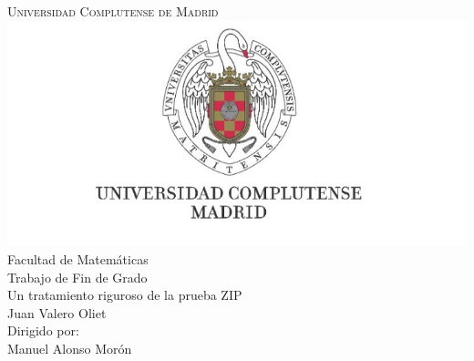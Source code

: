 \documentclass[10pt]{report}
\theoremstyle{definition}
\newcommand\blankpage{%
    \null
    \thispagestyle{empty}%
    \newpage}
\begin{document}
\begin{titlepage} %
\begin{center} %

\huge\textsc{Universidad Complutense de Madrid}\\[0.2in]
\includegraphics[scale=0.8]{comlu}\\[0.1in] %

\Large{Facultad de Matemáticas}\\[0.5in] %
\Large{Trabajo de Fin de Grado}\\[.1in]
\Huge {Un tratamiento riguroso de la prueba ZIP}\\[0.2in]



\vfill %
\Large {Juan Valero Oliet}\\[0.5in]
\vfill 
Dirigido por:\\
Manuel Alonso Morón\\[.1in]
\Large{}%
\end{center}

\end{titlepage}


\afterpage{\blankpage}
\end{document}
